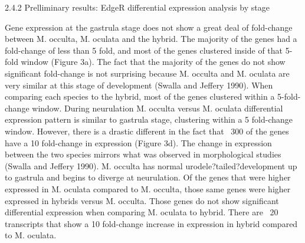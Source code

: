 2.4.2	Prelliminary results: EdgeR differential expression analysis by stage 

Gene expression at the gastrula stage does not show a great deal of fold-change between M. occulta, M. oculata and the hybrid. The majority of the genes had a fold-change of less than 5 fold, and most of the genes clustered inside of that 5-fold window (Figure 3a).  The fact that the majority of the genes do not show significant fold-change is not surprising because M. occulta and M. oculata are very similar at this stage of development (Swalla and Jeffery 1990).  When comparing each species to the hybrid, most of the genes clustered within a 5-fold-change window. 
During neurulation M. occulta versus M. oculata differential expression pattern is similar to gastrula stage, clustering within a 5 fold-change window. However, there is a drastic different in the fact that ~300 of the genes have a 10 fold-change in expression (Figure 3d).  The change in expression between the two species mirrors what was observed in morphological studies (Swalla and Jeffery 1990). M. occulta has normal urodele?tailed?development up to gastrula and begins to diverge at neurulation. Of the genes that were higher expressed in M. oculata compared to M. occulta, those same genes were higher expressed in hybrids versus M. occulta. Those genes do not show significant differential expression when comparing M. oculata to hybrid. There are ~20 transcripts that show a 10 fold-change increase in expression in hybrid compared to M. oculata.
